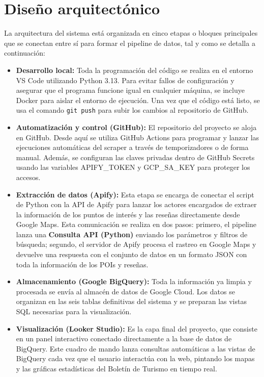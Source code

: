 

\section{Diseño arquitectónico}
La arquitectura del sistema está organizada en cinco etapas o bloques principales que se conectan entre sí para formar el pipeline de datos, tal y como se detalla a continuación:

\begin{itemize}
	\item \textbf{Desarrollo local:} Toda la programación del código se realiza en el entorno VS Code utilizando Python 3.13. Para evitar fallos de configuración y asegurar que el programa funcione igual en cualquier máquina, se incluye Docker para aislar el entorno de ejecución. Una vez que el código está listo, se usa el comando \texttt{git push} para subir los cambios al repositorio de GitHub.
	\item \textbf{Automatización y control (GitHub):} El repositorio del proyecto se aloja en GitHub. Desde aquí se utiliza GitHub Actions para programar y lanzar las ejecuciones automáticas del scraper a través de temporizadores o de forma manual. Además, se configuran las claves privadas dentro de GitHub Secrets usando las variables APIFY\_TOKEN y GCP\_SA\_KEY para proteger los accesos.
    \item \textbf{Extracción de datos (Apify):} Esta etapa se encarga de conectar el script de Python con la API de Apify para lanzar los actores encargados de extraer la información de los puntos de interés y las reseñas directamente desde Google Maps. Esta comunicación se realiza en dos pasos: primero, el pipeline lanza una \textbf{Consulta API (Python)} enviando los parámetros y filtros de búsqueda; segundo, el servidor de Apify procesa el rastreo en Google Maps y devuelve una respuesta con el conjunto de datos en un formato JSON con toda la información de los POIs y reseñas.
	\item \textbf{Almacenamiento (Google BigQuery):} Toda la información ya limpia y procesada se envía al almacén de datos de Google Cloud. Los datos se organizan en las seis tablas definitivas del sistema y se preparan las vistas SQL necesarias para la visualización.
    \item \textbf{Visualización (Looker Studio):} Es la capa final del proyecto, que consiste en un panel interactivo conectado directamente a la base de datos de BigQuery. Este cuadro de mando lanza consultas automáticas a las vistas de BigQuery cada vez que el usuario interactúa con la web, pintando los mapas y las gráficas estadísticas del Boletín de Turismo en tiempo real.
\end{itemize}

